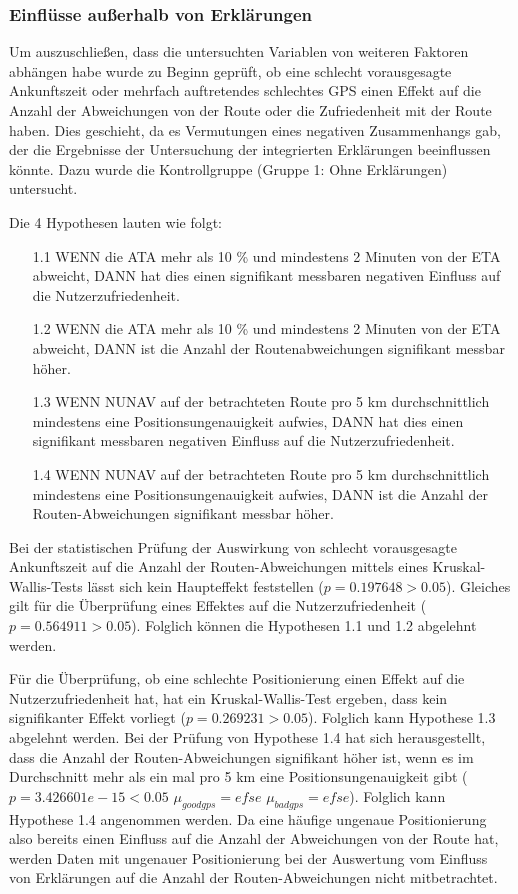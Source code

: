 \subsubsection{Einflüsse außerhalb von Erklärungen}
\label{sec:evaluation_other_dependencies}

Um auszuschließen, dass die untersuchten Variablen von weiteren Faktoren abhängen habe wurde zu Beginn geprüft, ob eine schlecht vorausgesagte Ankunftszeit oder mehrfach auftretendes schlechtes GPS einen Effekt auf die Anzahl der Abweichungen von der Route oder die Zufriedenheit mit der Route haben. Dies geschieht, da es Vermutungen eines negativen Zusammenhangs gab, der die Ergebnisse der Untersuchung der integrierten Erklärungen beeinflussen könnte. Dazu wurde die Kontrollgruppe (Gruppe 1: Ohne Erklärungen) untersucht.

Die 4 Hypothesen lauten wie folgt:

\begin{enumerate}
    \item[1.1] WENN die ATA mehr als 10 \% und mindestens 2 Minuten von der ETA abweicht, DANN hat dies einen signifikant messbaren negativen Einfluss auf die Nutzerzufriedenheit.
    \item[1.2] WENN die ATA mehr als 10 \% und mindestens 2 Minuten von der ETA abweicht, DANN ist die Anzahl der Routenabweichungen signifikant messbar höher.
    \item[1.3] WENN NUNAV auf der betrachteten Route pro 5 km durchschnittlich mindestens eine Positionsungenauigkeit aufwies, DANN hat dies einen signifikant messbaren negativen Einfluss auf die Nutzerzufriedenheit.
    \item[1.4] WENN NUNAV auf der betrachteten Route pro 5 km durchschnittlich mindestens eine Positionsungenauigkeit aufwies, DANN ist die Anzahl der Routen-Abweichungen signifikant messbar höher.
\end{enumerate}

Bei der statistischen Prüfung der Auswirkung von schlecht vorausgesagte Ankunftszeit auf die Anzahl der Routen-Abweichungen mittels eines Kruskal-Wallis-Tests lässt sich kein Haupteffekt feststellen ($ p = 0.197648 > 0.05 $). Gleiches gilt für die Überprüfung eines Effektes auf die Nutzerzufriedenheit ($ p = 0.564911 > 0.05 $). Folglich können die Hypothesen 1.1 und 1.2 abgelehnt werden.

Für die Überprüfung, ob eine schlechte Positionierung einen Effekt auf die Nutzerzufriedenheit hat, hat ein Kruskal-Wallis-Test ergeben, dass kein signifikanter Effekt vorliegt ($ p = 0.269231 > 0.05 $). Folglich kann Hypothese 1.3 abgelehnt werden. Bei der Prüfung von Hypothese 1.4 hat sich herausgestellt, dass die Anzahl der Routen-Abweichungen signifikant höher ist, wenn es im Durchschnitt mehr als ein mal pro 5 km eine Positionsungenauigkeit gibt ($ p = 3.426601e-15 < 0.05 $  $ \mu_{good gps}=efse $ $ \mu_{bad gps}=efse $). Folglich kann Hypothese 1.4 angenommen werden. Da eine häufige ungenaue Positionierung also bereits einen Einfluss auf die Anzahl der Abweichungen von der Route hat, werden Daten mit ungenauer Positionierung bei der Auswertung vom Einfluss von Erklärungen auf die Anzahl der Routen-Abweichungen nicht mitbetrachtet.

